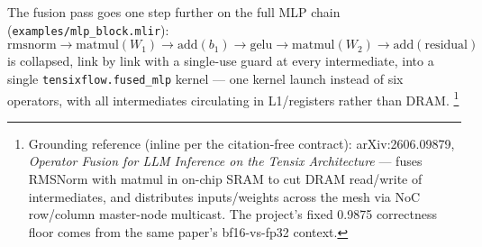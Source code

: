 The fusion pass goes one step further on the full MLP chain
(\texttt{examples/mlp\_block.mlir}):
\[
  \text{rmsnorm} \to \text{matmul}(W_1) \to \text{add}(b_1) \to \text{gelu}
  \to \text{matmul}(W_2) \to \text{add}(\text{residual})
\]
is collapsed, link by link with a single-use guard at every intermediate, into a
single \texttt{tensixflow.fused\_mlp} kernel --- one kernel launch instead of six
operators, with all intermediates circulating in L1/registers rather than DRAM.%
\footnote{Grounding reference (inline per the citation-free contract):
  arXiv:2606.09879, \emph{Operator Fusion for LLM Inference on the Tensix
  Architecture} --- fuses RMSNorm with matmul in on-chip SRAM to cut DRAM
  read/write of intermediates, and distributes inputs/weights across the mesh via
  NoC row/column master-node multicast. The project's fixed 0.9875 correctness
  floor comes from the same paper's bf16-vs-fp32 context.}

